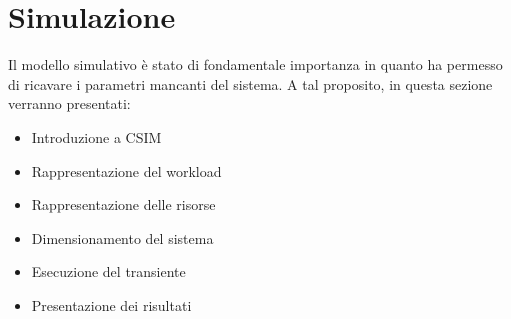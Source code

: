 \chapter{Simulazione}
Il modello simulativo è stato di fondamentale importanza in quanto ha permesso di ricavare i parametri mancanti del sistema. A tal proposito, in questa sezione verranno presentati:
\begin{itemize}
	\item Introduzione a CSIM
	\item Rappresentazione del workload
	\item Rappresentazione delle risorse
	\item Dimensionamento del sistema
	\item Esecuzione del transiente
	\item Presentazione dei risultati
\end{itemize}
